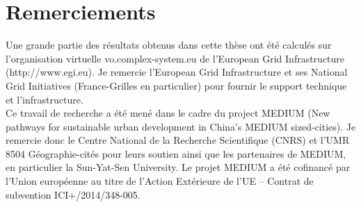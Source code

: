 




\begingroup

\let\clearpage\relax
\let\cleardoublepage\relax
\let\cleardoublepage\relax

\chapter*{Remerciements}




Une grande partie des résultats obtenus dans cette thèse ont été calculés sur l'organisation virtuelle vo.complex-system.eu de l'European Grid Infrastructure (http://www.egi.eu). Je remercie l'European Grid Infrastructure et ses National Grid Initiatives (France-Grilles en particulier) pour fournir le support technique et l'infrastructure. \\


Ce travail de recherche a été mené dans le cadre du project MEDIUM (New pathways for sustainable urban development in China’s MEDIUM sized-cities). Je remercie donc le Centre National de la Recherche Scientifique (CNRS) et l’UMR 8504 Géographie-cités pour leurs soutien ainsi que les partenaires de MEDIUM, en particulier la Sun-Yat-Sen University. Le projet MEDIUM a été cofinancé par l’Union européenne au titre de l’Action Extérieure de l’UE – Contrat de subvention ICI+/2014/348-005.\\


